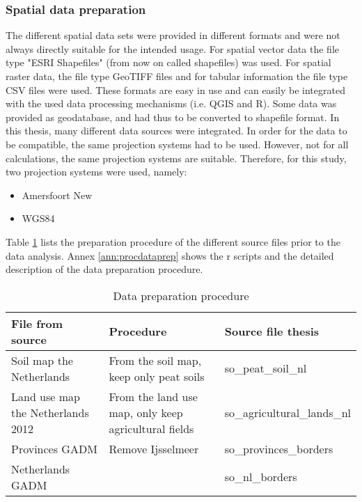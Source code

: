 \documentclass[a4paper,12pt]{scrbook}
\begin{document}
\subsubsection{Spatial data preparation}
The different spatial data sets were provided in different formats and were not always directly suitable for the intended usage.
For spatial vector data the file type "ESRI Shapefiles" (from now on called shapefiles) was used. For spatial raster data, the file type \ac{GeoTIFF} files and for tabular information the file type \ac{CSV} files were used. These formats are easy in use and can easily be integrated with the used data processing mechanisms (i.e. \ac{QGIS} and R). Some data was provided as geodatabase, and had thus to be converted to shapefile format. In this thesis, many different data sources were integrated. In order for the data to be compatible, the same projection systems had to be used. However, not for all calculations, the same projection systems are suitable. Therefore, for this study, two projection systems were used, namely:

\begin{itemize}
\item Amersfoort New 
\item WGS84
\end{itemize}

Table \ref{tab:procdataprep} lists the preparation procedure of the different source files prior to the data analysis. Annex \ref{ann:procdataprep} shows the r scripts and the detailed description of the data preparation procedure.


\begin{table}[htbp]
\caption{Data preparation procedure}
\begin{center}
\begin{tabular}{|p{5cm}|p{5cm}|p{5cm}|}
\hline
\textbf{File from source} & \textbf{Procedure} & \textbf{Source file thesis} \\ \hline
Soil map the Netherlands & From the soil map, keep only peat soils & so\_peat\_soil\_nl \\ \hline
Land use map the Netherlands 2012 & From the land use map, only keep agricultural fields & so\_agricultural\_lands\_nl \\ \hline
Provinces GADM & Remove Ijsselmeer & so\_provinces\_borders \\ \hline
Netherlands GADM &  & so\_nl\_borders \\ \hline
\end{tabular}
\end{center}
\label{tab:procdataprep}
\end{table}
\end{document}
